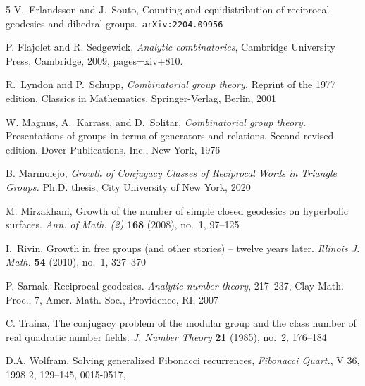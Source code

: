 \documentclass[11pt]{amsart}
\numberwithin{equation}{section}
\theoremstyle{plain}
\begin{document}
\begin{thebibliography}{5}
 V.~Erlandsson and J.~Souto, Counting and equidistribution of reciprocal geodesics and dihedral groups.\texttt{ arXiv:2204.09956}

 P. Flajolet and  R. Sedgewick,
   {\it Analytic combinatorics},
  Cambridge University Press, Cambridge, 2009,
   pages={xiv+810}.

 R.~Lyndon and P.~Schupp, {\it Combinatorial group theory.} Reprint of the 1977 edition. Classics in Mathematics. Springer-Verlag, Berlin, 2001

  W. Magnus, A.~Karrass, and D.~Solitar, {\it Combinatorial group theory.} Presentations of groups in terms of generators and relations. Second revised edition. Dover Publications, Inc., New York, 1976
 
  B. Marmolejo, {\it Growth of Conjugacy Classes of Reciprocal Words in Triangle Groups.}
Ph.D. thesis, City University of New York, 2020


 M. Mirzakhani, Growth of the number of simple closed geodesics on hyperbolic surfaces. {\it Ann. of Math. (2)} \textbf{168} (2008), no.~1, 97--125




  I.~Rivin, Growth in free groups (and other stories) -- twelve years later. {\it Illinois J. Math.} \textbf{54} (2010), no.~1, 327--370


 P. Sarnak, Reciprocal geodesics. {\it Analytic number theory}, 217--237, Clay Math. Proc., 7, Amer. Math. Soc., Providence, RI, 2007


 C. Traina, The conjugacy problem of the modular group and the class number of real quadratic number fields. {\it J. Number Theory} \textbf{21} (1985), no.~2, 176--184

  D.A.  Wolfram,  Solving generalized Fibonacci recurrences, {\it  Fibonacci Quart.}, V 36, 1998 2, 129--145, 0015-0517, 
 
  
 \end{thebibliography}
\end{document}
